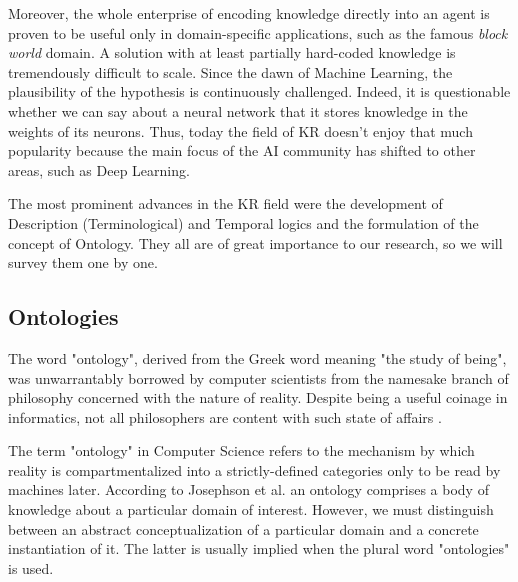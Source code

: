 Moreover, the whole enterprise of encoding knowledge directly into an agent is proven to be useful only in domain-specific
applications, such as the famous \textit{block world} \cite{shrdlu} domain. A solution with at least partially hard-coded
knowledge is tremendously difficult to scale. Since the dawn of Machine Learning, the plausibility of the hypothesis is
continuously challenged. Indeed, it is questionable whether we can say about a neural network that it stores knowledge in the
weights of its neurons. Thus, today the field of KR doesn't enjoy that much popularity because the main focus of the AI community
has shifted to other areas, such as Deep Learning.

The most prominent advances in the KR field were the development of Description (Terminological) and Temporal logics and the
formulation of the concept of Ontology. They all are of great importance to our research, so we will survey them one by one.

\subsection{Ontologies}
The word "ontology", derived from the Greek word meaning "the study of being", was unwarrantably borrowed by computer scientists
from the namesake branch of philosophy concerned with the nature of reality. Despite being a useful coinage in
informatics, not all philosophers are content with such state of affairs \cite{confusion}.

The term "ontology" in Computer Science refers to the mechanism by which reality is compartmentalized into a strictly-defined
categories only to be read by machines later. According to Josephson et al. \cite{ontowhy} an ontology comprises a body of
knowledge about a particular domain of interest. However, we must distinguish between an abstract conceptualization of a
particular domain and a concrete instantiation of it. The latter is usually implied when the plural word "ontologies" is used.

